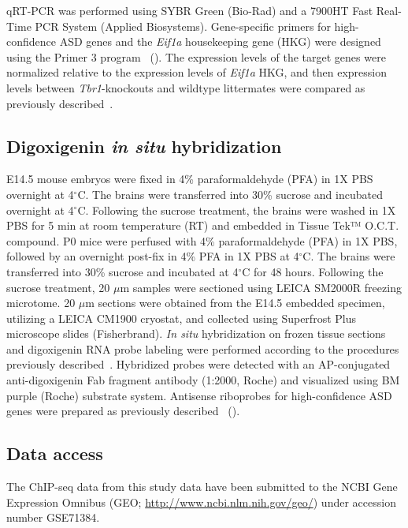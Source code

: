 qRT-PCR was performed using SYBR Green (Bio-Rad) and a 7900HT Fast
Real-Time PCR System (Applied Biosystems). Gene-speciﬁc primers for
high-confidence ASD genes and the \emph{Eif1a} housekeeping gene (HKG)
were designed using the Primer 3 program~\citep{Rozen:2000wg}
(). The expression levels of the target genes were
normalized relative to the expression levels of \emph{Eif1a} HKG, and
then expression levels between \emph{Tbr1}-knockouts and wildtype
littermates were compared as previously described~\citep{Pfaffl:2001vs, Darbandi:2009ht}.

\subsection{Digoxigenin \emph{in situ} hybridization}

E14.5 mouse embryos were fixed in 4\% paraformaldehyde (PFA) in 1X PBS
overnight at 4$^\circ$C. The brains were transferred into 30\% sucrose and
incubated overnight at 4$^\circ$C. Following the sucrose treatment, the brains
were washed in 1X PBS for 5 min at room temperature (RT) and embedded in
Tissue Tek™ O.C.T. compound. P0 mice were perfused with 4\%
paraformaldehyde (PFA) in 1X PBS, followed by an overnight post-fix in
4\% PFA in 1X PBS at 4$^\circ$C. The brains were transferred into 30\% sucrose
and incubated at 4$^\circ$C for 48 hours. Following the sucrose treatment, 20
$\mu$m samples were sectioned using LEICA SM2000R freezing microtome. 20 $\mu$m
sections were obtained from the E14.5 embedded specimen, utilizing a
LEICA CM1900 cryostat, and collected using
Superfrost Plus microscope slides (Fisherbrand).
\emph{In situ} hybridization on frozen tissue sections and digoxigenin
RNA probe labeling were performed according to the procedures previously
described~\citep{Long:2003tj, Wallace:1999us}. Hybridized probes
were detected with an AP-conjugated anti-digoxigenin Fab fragment
antibody (1:2000, Roche) and visualized using BM purple (Roche)
substrate system. Antisense riboprobes for high-confidence ASD genes
were prepared as previously described~\citep{Cobos:2005gy, Long:2003tj} 
().

\subsection{Data access}

The ChIP-seq data from this study data have been submitted to the NCBI
Gene Expression Omnibus (GEO; \url{http://www.ncbi.nlm.nih.gov/geo/}) under
accession number GSE71384.
